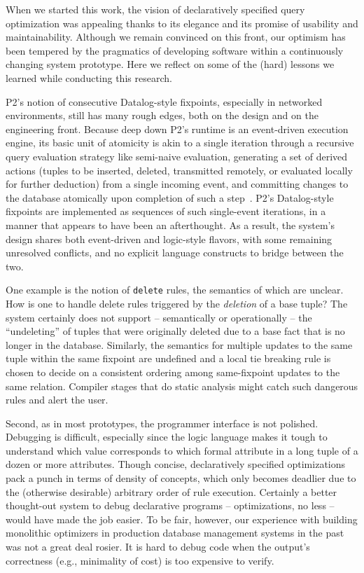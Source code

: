 \documentclass{sigmod08}
\newcommand{\ol}[1]{\texttt{\small #1}\xspace}
\begin{document}
When we started this work, the vision of declaratively specified
query optimization was appealing thanks to its elegance and its
promise of usability and maintainability.  Although we remain convinced on this front, our optimism has been tempered by the pragmatics of developing software within a
continuously changing system prototype.  Here we reflect on some
of the (hard) lessons we learned while conducting this research.


P2's notion of
consecutive Datalog-style fixpoints, especially in networked
environments, still has many rough edges, both on the design and on the
engineering front.  Because deep down P2's runtime is an event-driven execution
engine, its basic unit of atomicity is akin to a single iteration through a recursive query evaluation strategy like semi-naive evaluation, generating a set of derived actions (tuples to be inserted, deleted, transmitted
remotely, or evaluated locally for further deduction) from a single incoming event, and committing changes to the database atomically upon completion of such a step~\cite{LuThesis}. P2's
Datalog-style fixpoints are implemented as sequences of such
single-event iterations, in a manner that appears to have been an afterthought. As a result, the system's
design shares both 
event-driven and logic-style flavors, with some remaining unresolved
conflicts, and no explicit language constructs to bridge between the two.

One example is the notion of \ol{delete} rules, the semantics of which are unclear.  How is one to handle delete rules triggered by the
\emph{deletion} of a base tuple?  The system certainly does not support
-- semantically or operationally -- the ``undeleting'' of tuples that were
originally deleted due to a base fact that is no longer in the
database.  Similarly, the semantics for multiple updates to
the same tuple within the same fixpoint are undefined and a local tie
breaking rule is chosen to decide on a consistent ordering among
same-fixpoint updates to the same relation. Compiler
stages that do static analysis might catch such dangerous rules and alert the user.

Second, as in most prototypes, the programmer interface is not
polished. Debugging is difficult, especially since the logic language
makes it tough to understand which value corresponds to which formal
attribute in a long tuple of a dozen or more attributes.  Though
concise, declaratively specified optimizations pack a punch in terms of
density of concepts, which only becomes deadlier due to the (otherwise
desirable) arbitrary order of rule execution.  Certainly a better
thought-out system to debug declarative programs -- optimizations, no
less -- would have made the job easier.  To be fair, however, our
experience with building monolithic optimizers in production database
management systems in the past was not a great deal rosier.  It is hard to debug code when the output's correctness (e.g., minimality of cost) is too expensive to verify.
\end{document}
